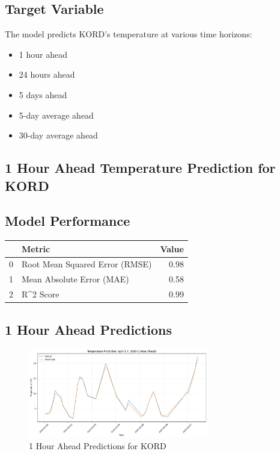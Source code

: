 \subsection{Target Variable}
The model predicts KORD's temperature at various time horizons:
\begin{itemize}
  \item 1 hour ahead
  \item 24 hours ahead
  \item 5 days ahead
  \item 5-day average ahead
  \item 30-day average ahead
\end{itemize}

\subsection{1 Hour Ahead Temperature Prediction for KORD}
\subsection{Model Performance}
\begin{tabular}{llr}
\toprule
 & Metric & Value \\
\midrule
0 & Root Mean Squared Error (RMSE) & 0.98 \\
1 & Mean Absolute Error (MAE) & 0.58 \\
2 & R^2 Score & 0.99 \\
\bottomrule
\end{tabular}

\subsection{1 Hour Ahead Predictions}
\begin{figure}[htbp]
\centering
\includegraphics[width=0.7\textwidth]{1-0-linear_temp_shift_results.png}
\caption{1 Hour Ahead Predictions for KORD}
\label{fig:1_hour_ahead_pred}
\end{figure}

